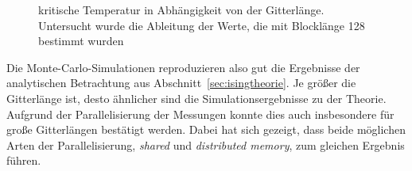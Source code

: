 	\begin{figure}[htbp]
		
		\caption[kritische Temperatur in Abhängigkeit von der Gitterlänge]{kritische Temperatur in Abhängigkeit von der Gitterlänge. Untersucht wurde die Ableitung der Werte, die mit Blocklänge 128 bestimmt wurden}
		\label{fig:tkritlaenge}
	\end{figure}

	
	Die Monte-Carlo-Simulationen reproduzieren also gut die Ergebnisse der analytischen Betrachtung aus Abschnitt~\ref{sec:isingtheorie}. Je größer die Gitterlänge ist, desto ähnlicher sind die Simulationsergebnisse zu der Theorie. Aufgrund der Parallelisierung der Messungen konnte dies auch insbesondere für große Gitterlängen bestätigt werden. Dabei hat sich gezeigt, dass beide möglichen Arten der Parallelisierung, \textit{shared} und \textit{distributed memory}, zum gleichen Ergebnis führen.
	
	
%	
%			
%			
%			
	
